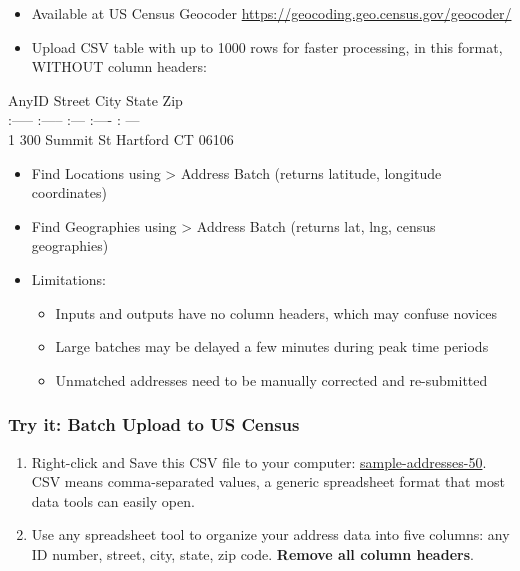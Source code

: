 \documentclass[
  english,
]{book}
\providecommand{\tightlist}{%
  \setlength{\itemsep}{0pt}\setlength{\parskip}{0pt}}
\begin{document}
\begin{itemize}
\tightlist
\item
  Available at US Census Geocoder \url{https://geocoding.geo.census.gov/geocoder/}
\item
  Upload CSV table with up to 1000 rows for faster processing, in this format, WITHOUT column headers:
\end{itemize}

AnyID \textbar{} Street \textbar{} City \textbar{} State \textbar{} Zip \textbar{}\\
:----- \textbar{} :----- \textbar{} :--- \textbar{} :---- \textbar{} : --- \textbar{}\\
1 \textbar{} 300 Summit St \textbar{} Hartford \textbar{} CT \textbar{} 06106 \textbar{}

\begin{itemize}
\tightlist
\item
  Find Locations using \textgreater{} Address Batch (returns latitude, longitude coordinates)
\item
  Find Geographies using \textgreater{} Address Batch (returns lat, lng, census geographies)
\item
  Limitations:

  \begin{itemize}
  \tightlist
  \item
    Inputs and outputs have no column headers, which may confuse novices
  \item
    Large batches may be delayed a few minutes during peak time periods
  \item
    Unmatched addresses need to be manually corrected and re-submitted
  \end{itemize}
\end{itemize}

\hypertarget{try-it-batch-upload-to-us-census}{%
\subsubsection*{Try it: Batch Upload to US Census}\label{try-it-batch-upload-to-us-census}}

\begin{enumerate}
\def\labelenumi{\arabic{enumi})}
\item
  Right-click and Save this CSV file to your computer: \href{sample-addresses-50.csv}{sample-addresses-50}. CSV means comma-separated values, a generic spreadsheet format that most data tools can easily open.
\item
  Use any spreadsheet tool to organize your address data into five columns: any ID number, street, city, state, zip code. \textbf{Remove all column headers}.
\end{enumerate}
\end{document}
